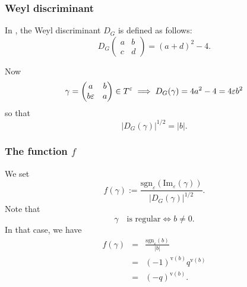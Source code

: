 \documentclass[11pt]{amsart}
\numberwithin{equation}{section}
\def\sgn{\mathrm{sgn}}
\def\val{\mathrm{v}}
\def\SL{\mathrm{SL}}
\newcommand{\<}{\left\langle}
\renewcommand{\>}{\right\rangle}
\begin{document}
\subsubsection{Weyl discriminant} In \cite[Definition 3.7]{ADSS}, the Weyl discriminant $D_G$ is defined as follows:  
\[
D_G \left(
\begin{array}{cc}
a & b\\
c & d
\end{array}
\right)
= (a + d)^2 - 4.
\]

  
Now
\[
\gamma = \left(
\begin{matrix}
a&b\cr
b\varepsilon &a
\end{matrix}\right) \in T^\varepsilon
\implies D_G(\gamma) =  4a^2 - 4 = 4 \varepsilon b^2
\]
so that
\[
|D_G(\gamma)|^{1/2}  = |b|.
\]

\subsubsection{The function $f$} We set
\begin{equation} \label{eqn:fgamma}
f(\gamma):= \frac{\sgn_\varepsilon(\mathrm{Im}_\varepsilon(\gamma))}{|D_G(\gamma)|^{1/2}} .
\end{equation}
Note that 
\[
\gamma \quad  \textrm {is regular} \iff b \neq 0.
\]
In that case, we have
\begin{eqnarray*} 
f(\gamma)&=& \frac{\sgn_\varepsilon(b)}{|b|}\\
&=& (-1)^{\val(b)} q^{\val(b)}\\
&=& (-q)^{\val(b)}.
\end{eqnarray*}
\end{document}
